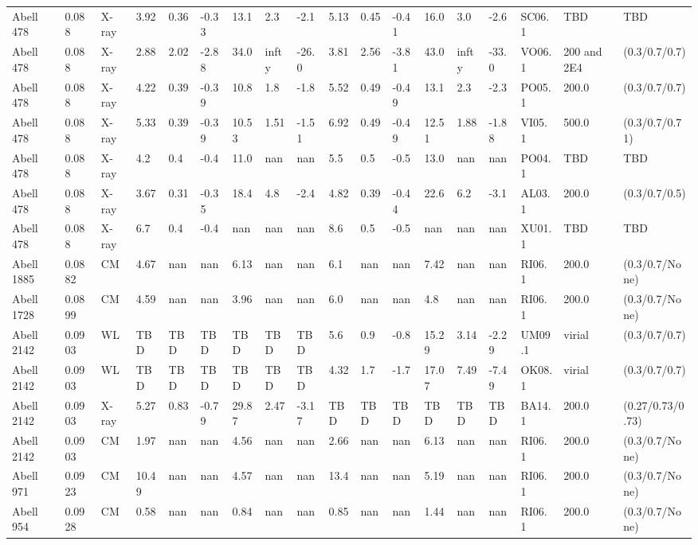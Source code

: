 \documentclass{article}
\begin{document}
\begin{center}
\begin{landscape}
\begin{longtable}{llllllllllllllllll}
Abell 478 & 0.088 & X-ray & 3.92 & 0.36 & -0.33 & 13.1 & 2.3 & -2.1 & 5.13 & 0.45 & -0.41 & 16.0 & 3.0 & -2.6 & SC06.1 & TBD & TBD \\
Abell 478 & 0.088 & X-ray & 2.88 & 2.02 & -2.88 & 34.0 & infty & -26.0 & 3.81 & 2.56 & -3.81 & 43.0 & infty & -33.0 & VO06.1 & 200 and 2E4 & (0.3/0.7/0.7) \\
Abell 478 & 0.088 & X-ray & 4.22 & 0.39 & -0.39 & 10.8 & 1.8 & -1.8 & 5.52 & 0.49 & -0.49 & 13.1 & 2.3 & -2.3 & PO05.1 & 200.0 & (0.3/0.7/0.7) \\
Abell 478 & 0.088 & X-ray & 5.33 & 0.39 & -0.39 & 10.53 & 1.51 & -1.51 & 6.92 & 0.49 & -0.49 & 12.51 & 1.88 & -1.88 & VI05.1 & 500.0 & (0.3/0.7/0.71) \\
Abell 478 & 0.088 & X-ray & 4.2 & 0.4 & -0.4 & 11.0 & nan & nan & 5.5 & 0.5 & -0.5 & 13.0 & nan & nan & PO04.1 & TBD & TBD \\
Abell 478 & 0.088 & X-ray & 3.67 & 0.31 & -0.35 & 18.4 & 4.8 & -2.4 & 4.82 & 0.39 & -0.44 & 22.6 & 6.2 & -3.1 & AL03.1 & 200.0 & (0.3/0.7/0.5) \\
Abell 478 & 0.088 & X-ray & 6.7 & 0.4 & -0.4 & nan & nan & nan & 8.6 & 0.5 & -0.5 & nan & nan & nan & XU01.1 & TBD & TBD \\
Abell 1885 & 0.0882 & CM & 4.67 & nan & nan & 6.13 & nan & nan & 6.1 & nan & nan & 7.42 & nan & nan & RI06.1 & 200.0 & (0.3/0.7/None) \\
Abell 1728 & 0.0899 & CM & 4.59 & nan & nan & 3.96 & nan & nan & 6.0 & nan & nan & 4.8 & nan & nan & RI06.1 & 200.0 & (0.3/0.7/None) \\
Abell 2142 & 0.0903 & WL & TBD & TBD & TBD & TBD & TBD & TBD & 5.6 & 0.9 & -0.8 & 15.29 & 3.14 & -2.29 & UM09.1 & virial & (0.3/0.7/0.7) \\
Abell 2142 & 0.0903 & WL & TBD & TBD & TBD & TBD & TBD & TBD & 4.32 & 1.7 & -1.7 & 17.07 & 7.49 & -7.49 & OK08.1 & virial & (0.3/0.7/0.7) \\
Abell 2142 & 0.0903 & X-ray & 5.27 & 0.83 & -0.79 & 29.87 & 2.47 & -3.17 & TBD & TBD & TBD & TBD & TBD & TBD & BA14.1 & 200.0 & (0.27/0.73/0.73) \\
Abell 2142 & 0.0903 & CM & 1.97 & nan & nan & 4.56 & nan & nan & 2.66 & nan & nan & 6.13 & nan & nan & RI06.1 & 200.0 & (0.3/0.7/None) \\
Abell 971 & 0.0923 & CM & 10.49 & nan & nan & 4.57 & nan & nan & 13.4 & nan & nan & 5.19 & nan & nan & RI06.1 & 200.0 & (0.3/0.7/None) \\
Abell 954 & 0.0928 & CM & 0.58 & nan & nan & 0.84 & nan & nan & 0.85 & nan & nan & 1.44 & nan & nan & RI06.1 & 200.0 & (0.3/0.7/None) \\

\end{longtable}
\end{landscape}
\end{center}
\end{document}
